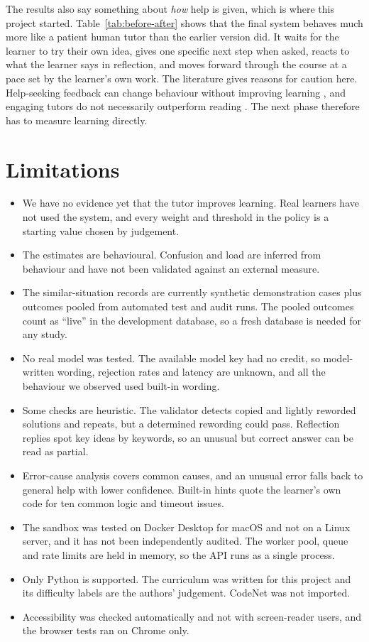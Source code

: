 The results also say something about \emph{how} help is given, which is where this project started. Table~\ref{tab:before-after} shows that the final system behaves much more like a patient human tutor than the earlier version did. It waits for the learner to try their own idea, gives one specific next step when asked, reacts to what the learner says in reflection, and moves forward through the course at a pace set by the learner's own work. The literature gives reasons for caution here. Help-seeking feedback can change behaviour without improving learning \cite{aleven2016}, and engaging tutors do not necessarily outperform reading \cite{schmucker2024}. The next phase therefore has to measure learning directly.

\section{Limitations}
\begin{itemize}
\item We have no evidence yet that the tutor improves learning. Real learners have not used the system, and every weight and threshold in the policy is a starting value chosen by judgement.
\item The estimates are behavioural. Confusion and load are inferred from behaviour and have not been validated against an external measure.
\item The similar-situation records are currently synthetic demonstration cases plus outcomes pooled from automated test and audit runs. The pooled outcomes count as ``live'' in the development database, so a fresh database is needed for any study.
\item No real model was tested. The available model key had no credit, so model-written wording, rejection rates and latency are unknown, and all the behaviour we observed used built-in wording.
\item Some checks are heuristic. The validator detects copied and lightly reworded solutions and repeats, but a determined rewording could pass. Reflection replies spot key ideas by keywords, so an unusual but correct answer can be read as partial.
\item Error-cause analysis covers common causes, and an unusual error falls back to general help with lower confidence. Built-in hints quote the learner's own code for ten common logic and timeout issues.
\item The sandbox was tested on Docker Desktop for macOS and not on a Linux server, and it has not been independently audited. The worker pool, queue and rate limits are held in memory, so the API runs as a single process.
\item Only Python is supported. The curriculum was written for this project and its difficulty labels are the authors' judgement. CodeNet was not imported.
\item Accessibility was checked automatically and not with screen-reader users, and the browser tests ran on Chrome only.
\end{itemize}

